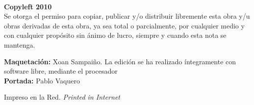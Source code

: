 \noindent
\textbf{\thetitle}\\
\theauthor

\bigskip\bigskip\footnotesize\noindent
\textbf{Copyleft \copyleft{} 2010 \theauthor}\\
Se otorga el permiso para copiar, publicar y/o distribuir libremente esta obra y/u obras derivadas de esta obra, ya sea total o parcialmente, por cualquier medio y con cualquier propósito sin ánimo de lucro, siempre y cuando esta nota se mantenga.

\bigskip\noindent
\textbf{Maquetación:} Xoan Sampaiño. La edición se ha realizado íntegramente con software libre, mediante el procesador \emph{\LaTeXe}\\
\textbf{Portada:} Pablo Vaquero

\bigskip\noindent
Impreso en la Red. \emph{Printed in Internet}
\normalsize
{}

\endinput
